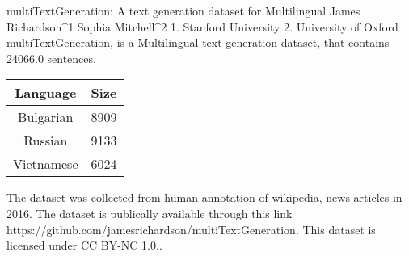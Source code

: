 
multiTextGeneration: A text generation dataset for Multilingual
James Richardson^1 Sophia Mitchell^2
1. Stanford University 2. University of Oxford
multiTextGeneration, is a Multilingual text generation dataset, that contains 24066.0 sentences.

    \begin{table}[h]
    \centering
    \begin{tabular}{|c|c|}
    \hline
    Language & Size \\
    \hline
    Bulgarian & 8909 \\ 
Russian & 9133 \\ 
Vietnamese & 6024 \\ 
 \hline
    \end{tabular}
    \end{table}
    
The dataset was collected from human annotation of wikipedia, news articles in 2016. 
The dataset is publically available through this link https://github.com/jamesrichardson/multiTextGeneration. This dataset is licensed under CC BY-NC 1.0..

